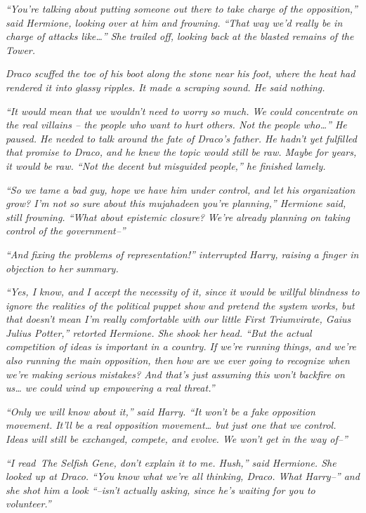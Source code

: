 \emph{``You're talking about putting someone out there to take charge of
the opposition,'' said Hermione, looking over at him and frowning.
``That way we'd really be in charge of attacks like\ldots{}'' She
trailed off, looking back at the blasted remains of the Tower.}

\emph{Draco scuffed the toe of his boot along the stone near his foot,
where the heat had rendered it into glassy ripples. It made a scraping
sound. He said nothing.}

\emph{``It would mean that we wouldn't need to worry so much. We could
concentrate on the real villains -- the people who want to hurt others.
Not the people who\ldots{}'' He paused. He needed to talk around the
fate of Draco's father. He hadn't yet fulfilled that promise to Draco,
and he knew the topic would still be raw. Maybe for years, it would be
raw. ``Not the decent but misguided people,'' he finished lamely.}

\emph{``So we tame a bad guy, hope we have him under control, and let
his organization grow? I'm not so sure about this mujahadeen you're
planning,'' Hermione said, still frowning. ``What about epistemic
closure? We're already planning on taking control of the government--''}

\emph{``And fixing the problems of representation!'' interrupted Harry,
raising a finger in objection to her summary.}

\emph{``Yes, I know, and I accept the necessity of it, since it would be
willful blindness to ignore the realities of the political puppet show
and pretend the system works, but that doesn't mean I'm really
comfortable with our little First Triumvirate, Gaius Julius Potter,''
retorted Hermione. She shook her head. ``But the actual competition of
ideas is important in a country. If we're running things, and we're also
running the main opposition, then how are we ever going to recognize
when we're making serious mistakes? And that's just assuming this won't
backfire on us\ldots{} we could wind up empowering a real threat.''}

\emph{``Only we will know about it,'' said Harry. ``It won't be a fake
opposition movement. It'll be a real opposition movement\ldots{} but
just one that we control. Ideas will still be exchanged, compete, and
evolve. We won't get in the way of--''}

\emph{``I read\emph{~The Selfish Gene}, don't explain it to me. Hush,''
said Hermione. She looked up at Draco. ``You know what we're all
thinking, Draco. What Harry--'' and she shot him a look ``--isn't
actually asking, since he's waiting for you to volunteer.''}

